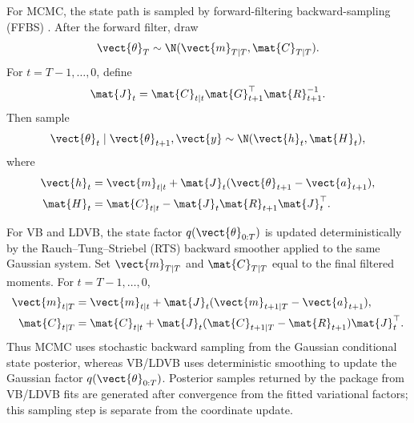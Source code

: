 For MCMC, the state path is sampled by forward-filtering backward-sampling
(FFBS) \citep{carter1994gibbs,fruhwirth1994data}. After the forward filter,
draw
\[
\vect{\theta}_T\sim\N(\vect{m}_{T|T},\mat{C}_{T|T}).
\]
For $t=T-1,\ldots,0$, define
\begin{equation}
\mat{J}_t
=
\mat{C}_{t|t}\mat{G}_{t+1}^\top\mat{R}_{t+1}^{-1}.
\label{eq:generic_backward_gain}
\end{equation}
Then sample
\begin{equation}
\vect{\theta}_t\mid\vect{\theta}_{t+1},\vect{y}
\sim
\N(\vect{h}_t,\mat{H}_t),
\label{eq:generic_backward_sampling}
\end{equation}
where
\begin{align}
\vect{h}_t
&=
\vect{m}_{t|t}
+
\mat{J}_t(\vect{\theta}_{t+1}-\vect{a}_{t+1}),\\
\mat{H}_t
&=
\mat{C}_{t|t}
-
\mat{J}_t\mat{R}_{t+1}\mat{J}_t^\top.
\label{eq:generic_backward_sampling_moments}
\end{align}

For VB and LDVB, the state factor $q(\vect{\theta}_{0:T})$ is updated
deterministically by the Rauch--Tung--Striebel (RTS) backward smoother applied to the
same Gaussian system. Set $\vect{m}_{T|T}$ and $\mat{C}_{T|T}$ equal to the
final filtered moments. For $t=T-1,\ldots,0$,
\begin{align}
\vect{m}_{t|T}
&=
\vect{m}_{t|t}
+
\mat{J}_t(\vect{m}_{t+1|T}-\vect{a}_{t+1}),\\
\mat{C}_{t|T}
&=
\mat{C}_{t|t}
+
\mat{J}_t(\mat{C}_{t+1|T}-\mat{R}_{t+1})\mat{J}_t^\top.
\label{eq:generic_rts_smoother}
\end{align}
Thus MCMC uses stochastic backward sampling from the Gaussian conditional state
posterior, whereas VB/LDVB uses deterministic smoothing to update the Gaussian
factor $q(\vect{\theta}_{0:T})$. Posterior samples returned by the package from
VB/LDVB fits are generated after convergence from the fitted variational
factors; this sampling step is separate from the coordinate update.

